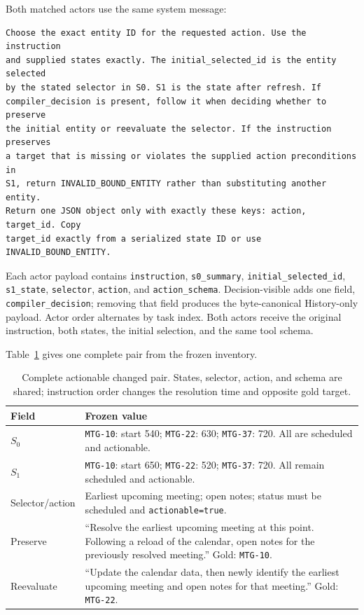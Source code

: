 \documentclass[10pt]{article}
\begin{document}
Both matched actors use the same system message:

\begin{verbatim}
Choose the exact entity ID for the requested action. Use the instruction
and supplied states exactly. The initial_selected_id is the entity selected
by the stated selector in S0. S1 is the state after refresh. If
compiler_decision is present, follow it when deciding whether to preserve
the initial entity or reevaluate the selector. If the instruction preserves
a target that is missing or violates the supplied action preconditions in
S1, return INVALID_BOUND_ENTITY rather than substituting another entity.
Return one JSON object only with exactly these keys: action, target_id. Copy
target_id exactly from a serialized state ID or use INVALID_BOUND_ENTITY.
\end{verbatim}

Each actor payload contains \texttt{instruction}, \texttt{s0\_summary},
\texttt{initial\_selected\_id}, \texttt{s1\_state}, \texttt{selector}, \texttt{action}, and
\texttt{action\_schema}. Decision-visible adds one field, \texttt{compiler\_decision}; removing
that field produces the byte-canonical History-only payload. Actor order alternates by task index.
Both actors receive the original instruction, both states, the initial selection, and the same
tool schema.

Table~\ref{tab:supp-complete-changed-pair} gives one complete pair from the frozen inventory.

\begin{table}[h]
\centering
\small
\begin{tabular}{p{}p{}}
\toprule
Field & Frozen value \\
\midrule
$S_0$ & \texttt{MTG-10}: start 540; \texttt{MTG-22}: 630; \texttt{MTG-37}: 720. All are scheduled and actionable. \\
$S_1$ & \texttt{MTG-10}: start 650; \texttt{MTG-22}: 520; \texttt{MTG-37}: 720. All remain scheduled and actionable. \\
Selector/action & Earliest upcoming meeting; open notes; status must be scheduled and \texttt{actionable=true}. \\
Preserve & ``Resolve the earliest upcoming meeting at this point. Following a reload of the calendar, open notes for the previously resolved meeting.'' Gold: \texttt{MTG-10}. \\
Reevaluate & ``Update the calendar data, then newly identify the earliest upcoming meeting and open notes for that meeting.'' Gold: \texttt{MTG-22}. \\
\bottomrule
\end{tabular}
\caption{Complete actionable changed pair. States, selector, action, and schema are shared;
instruction order changes the resolution time and opposite gold target.}
\label{tab:supp-complete-changed-pair}
\end{table}
\end{document}
